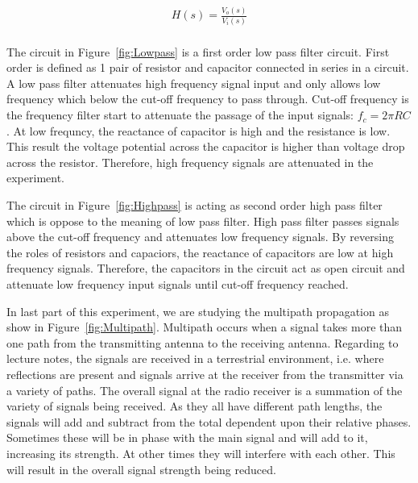 \documentclass[a4paper, 12pt, english]{article}
\begin{document}
\begin{gather*}
	H(s) = \frac{V_o(s)}{V_i(s)}\\
\end{gather*}

The circuit in Figure~\ref{fig:Lowpass} is a first order low pass filter
circuit. First order is defined as 1 pair of resistor and capacitor connected
in series in a circuit. A low pass filter attenuates high frequency signal
input and only allows low frequency which below the cut-off frequency to pass
through. Cut-off frequency is the frequency filter start to attenuate the
passage of the input signals: $f_c = 2\pi RC$. At low frequncy, the reactance
of capacitor is high and the resistance is low. This result the voltage
potential across the capacitor is higher than voltage drop across the resistor.
Therefore, high frequency signals are attenuated in the experiment. \newline

The circuit in Figure~\ref{fig:Highpass} is acting as second order high pass
filter which is oppose to the meaning of low pass filter. High pass filter
passes signals above the cut-off frequency and attenuates low frequency
signals. By reversing the roles of resistors and capaciors, the reactance of
capacitors are low at high frequency signals. Therefore, the capacitors in the
circuit act as open circuit and attenuate low frequency input signals until
cut-off frequency reached. \newline

In last part of this experiment, we are studying the multipath propagation as
show in Figure~\ref{fig:Multipath}. Multipath occurs when a signal takes more
than one path from the transmitting antenna to the receiving antenna. Regarding
to lecture notes, the signals are received in a terrestrial environment, i.e.
where reflections are present and signals arrive at the receiver from the
transmitter via a variety of paths. The overall signal at the radio receiver is
a summation of the variety of signals being received. As they all have
different path lengths, the signals will add and subtract from the total
dependent upon their relative phases. Sometimes these will be in phase with the
main signal and will add to it, increasing its strength. At other times they
will interfere with each other. This will result in the overall signal strength
being reduced.

\newpage
\end{document}
